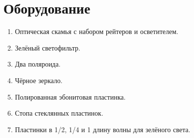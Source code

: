 \section*{Оборудование}

\begin{enumerate}
	\item Оптическая скамья с набором рейтеров и осветителем.
	
	\item Зелёный светофильтр.
	
	\item Два поляроида.
	
	\item Чёрное зеркало.
	
	\item Полированная эбонитовая пластинка.
	
	\item Стопа стеклянных пластинок.
	
	\item Пластинки в 1/2, 1/4 и 1 длину волны для зелёного света.
\end{enumerate}